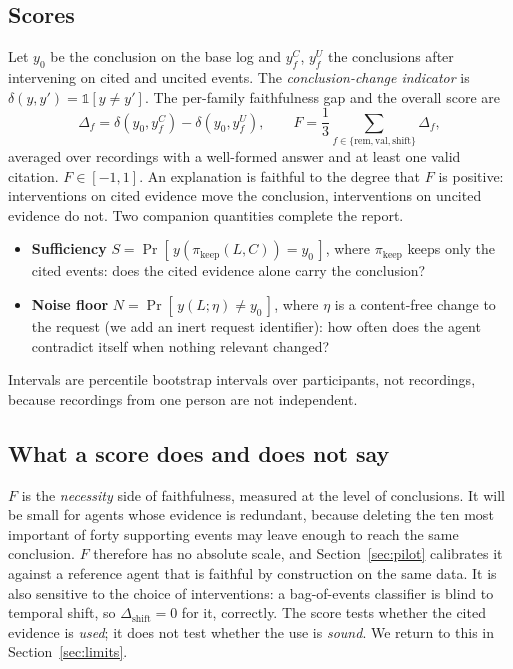 \documentclass[11pt,a4paper]{article}
\begin{document}
\subsection{Scores}
Let $y_0$ be the conclusion on the base log and $y_f^{C}$, $y_f^{U}$ the conclusions after intervening on cited and uncited events. The \emph{conclusion-change indicator} is $\delta(y,y')=\mathbb 1[y\neq y']$. The per-family faithfulness gap and the overall score are
\begin{equation}
\Delta_f=\delta(y_0,y_f^{C})-\delta(y_0,y_f^{U}),\qquad F=\frac13\sum_{f\in\{\mathrm{rem},\mathrm{val},\mathrm{shift}\}}\Delta_f,
\end{equation}
averaged over recordings with a well-formed answer and at least one valid citation. $F\in[-1,1]$. An explanation is faithful to the degree that $F$ is positive: interventions on cited evidence move the conclusion, interventions on uncited evidence do not. Two companion quantities complete the report.
\begin{itemize}[nosep]
\item \textbf{Sufficiency} $S=\Pr[\,y(\pi_{\mathrm{keep}}(L,C))=y_0\,]$, where $\pi_{\mathrm{keep}}$ keeps only the cited events: does the cited evidence alone carry the conclusion?
\item \textbf{Noise floor} $N=\Pr[\,y(L;\eta)\neq y_0\,]$, where $\eta$ is a content-free change to the request (we add an inert request identifier): how often does the agent contradict itself when nothing relevant changed?
\end{itemize}
Intervals are percentile bootstrap intervals over participants, not recordings, because recordings from one person are not independent.

\subsection{What a score does and does not say}
$F$ is the \emph{necessity} side of faithfulness, measured at the level of conclusions. It will be small for agents whose evidence is redundant, because deleting the ten most important of forty supporting events may leave enough to reach the same conclusion. $F$ therefore has no absolute scale, and Section~\ref{sec:pilot} calibrates it against a reference agent that is faithful by construction on the same data. It is also sensitive to the choice of interventions: a bag-of-events classifier is blind to temporal shift, so $\Delta_{\mathrm{shift}}=0$ for it, correctly. The score tests whether the cited evidence is \emph{used}; it does not test whether the use is \emph{sound}. We return to this in Section~\ref{sec:limits}.
\end{document}
